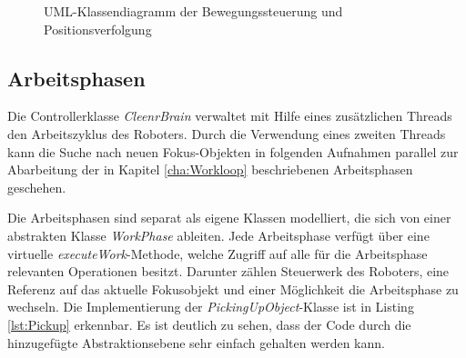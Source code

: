 \begin{figure}[H]
\centering
{}
\caption{UML-Klassendiagramm der Bewegungssteuerung und Positionsverfolgung}
\label{fig:UMLMovement}
\end{figure}

\subsection{Arbeitsphasen}

Die Controllerklasse \textit{CleenrBrain} verwaltet mit Hilfe eines zusätzlichen Threads den Arbeitszyklus des Roboters. Durch die Verwendung eines zweiten Threads kann die Suche nach neuen Fokus-Objekten in folgenden Aufnahmen parallel zur Abarbeitung der in Kapitel \ref{cha:Workloop} beschriebenen Arbeitsphasen geschehen. 

Die Arbeitsphasen sind separat als eigene Klassen modelliert, die sich von einer abstrakten Klasse \textit{WorkPhase} ableiten. Jede Arbeitsphase verfügt über eine virtuelle \textit{executeWork}-Methode, welche Zugriff auf alle für die Arbeitsphase relevanten Operationen besitzt. Darunter zählen Steuerwerk des Roboters, eine Referenz auf das aktuelle Fokusobjekt und einer Möglichkeit die Arbeitsphase zu wechseln. Die Implementierung der \textit{PickingUpObject}-Klasse ist in Listing \ref{lst:Pickup} erkennbar. Es ist deutlich zu sehen, dass der Code durch die hinzugefügte Abstraktionsebene sehr einfach gehalten werden kann.

